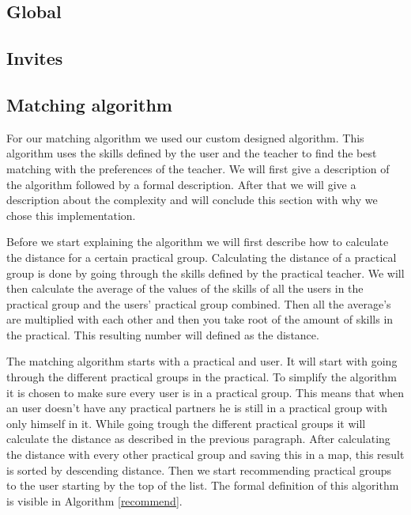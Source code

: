 \subsection{Global}

\subsection{Invites}

\subsection{Matching algorithm}
For our matching algorithm we used our custom designed algorithm.
This algorithm uses the skills defined by the user and the teacher to find the best matching with the preferences of the teacher.
We will first give a description of the algorithm followed by a formal description.
After that we will give a description about the complexity and will conclude this section with why we chose this implementation.

Before we start explaining the algorithm we will first describe how to calculate the distance for a certain practical group.
Calculating the distance of a practical group is done by going through the skills defined by the practical teacher.
We will then calculate the average of the values of the skills of all the users in the practical group and the users' practical group combined.
Then all the average's are multiplied with each other and then you take root of the amount of skills in the practical.
This resulting number will defined as the distance.

The matching algorithm starts with a practical and user.
It will start with going through the different practical groups in the practical.
To simplify the algorithm it is chosen to make sure every user is in a practical group.
This means that when an user doesn't have any practical partners he is still in a practical group with only himself in it.
While going trough the different practical groups it will calculate the distance as described in the previous paragraph.
After calculating the distance with every other practical group and saving this in a map, this result is sorted by descending distance.
Then we start recommending practical groups to the user starting by the top of the list.
The formal definition of this algorithm is visible in Algorithm \ref{recommend}.

